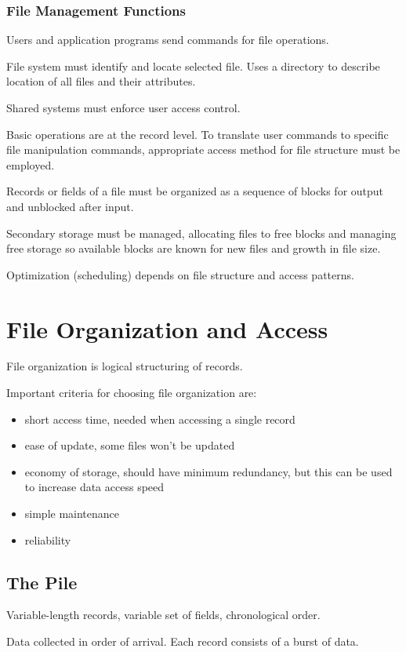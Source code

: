 \documentclass[11pt]{article}
\begin{document}
\subsubsection{File Management Functions}
\label{sec:org0ecff1c}
Users and application programs send commands for file operations.

File system must identify and locate selected file.
Uses a directory to describe location of all files and their attributes.

Shared systems must enforce user access control.

Basic operations are at the record level.
To translate user commands to specific file manipulation commands, appropriate
access method for file structure must be employed.

Records or fields of a file must be organized as a sequence of blocks for output
and unblocked after input.

Secondary storage must be managed, allocating files to free blocks and managing free
storage so available blocks are known for new files and growth in file size.

Optimization (scheduling) depends on file structure and access patterns.
\section{File Organization and Access}
\label{sec:orgfe47808}
File organization is logical structuring of records.

Important criteria for choosing file organization are:
\begin{itemize}
\item short access time, needed when accessing a single record
\item ease of update, some files won't be updated
\item economy of storage, should have minimum redundancy, but this can be used to increase
data access speed
\item simple maintenance
\item reliability
\end{itemize}
\subsection{The Pile}
\label{sec:org944a444}
Variable-length records, variable set of fields, chronological order.

Data collected in order of arrival.
Each record consists of a burst of data.
\end{document}
